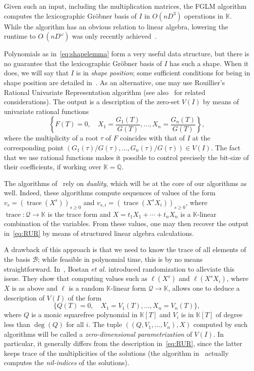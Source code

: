 \documentclass[12pt]{article}
\newcommand{\basis}{\mathscr{B}}
\newcommand{\trace}{\operatorname{trace}}
\newcommand{\lf}{X}
\newcommand{\residueI}{\mathscr{Q}}
\newcommand{\sqfree}{Q}
\def\Q {\ensuremath{\mathbb{Q}}}
\def\K{\mathbb{K}}
\def\K {\ensuremath{\mathbb{K}}}
\begin{document}
Given such an input, including the multiplication matrices, the FGLM
algorithm~\cite{FaGiLaMo93} computes the lexicographic Gr\"obner basis
of $I$ in $O(nD^3)$ operations in $\K$.  While the algorithm has an
obvious relation to linear algebra, lowering the runtime to
$O\tilde{~}(nD^\omega)$ was only recently
achieved~\cite{FaGaHuRe13,FaGaHuRe14,Neiger16}.

Polynomials as in~\cref{eq:shapelemma} form a very useful data
structure, but there is no guarantee that the lexicographic Gr\"obner
basis of $I$ has such a shape. When it does, we will say that $I$ is
in {\em shape position}; some sufficient conditions for being in shape
position are detailed in~\cite{BeMoMaTr94}.  As an alternative, one
may use Rouillier's Rational Univariate Representation algorithm
\cite{Rouillier99} (see also~\cite{AlBeRoWo94,BeWo96} for related
considerations). The output is a description of the zero-set $V(I)$ by
means of univariate rational functions
\begin{equation}\label{eq:RUR}
 \left\{  F(T)=0, \quad X_1 = \frac{G_1(T)}{G(T)}, \dots,X_n = \frac{G_n(T)}{G(T)} \right\},
\end{equation}
where the multiplicity of a root $\tau$ of $F$ coincides with that of
$I$ at the corresponding point
$(G_1(\tau)/G(\tau),\dots,G_n(\tau)/G(\tau)) \in V(I)$. The fact that
we use rational functions makes it possible to control
precisely the bit-size of their coefficients, if working over $\K=\Q$.

The algorithms of~\cite{AlBeRoWo94, BeWo96, Rouillier99} rely on
\emph{duality}, which will be at the core of our algorithms as well.
Indeed, these algorithms compute sequences of values of the form
$v_s=(\trace(\lf^s))_{s \ge 0}$ and 
$v_{s,i}=(\trace(\lf^s X_i))_{s \ge 0}$, where $\trace: \residueI \to \K$ is the trace 
form and $\lf=t_1 X_1 + \cdots + t_n X_n$ is  a $\K$-linear combination of the variables.
From these values, one may then recover the output in~\cref{eq:RUR} by means
of structured linear algebra calculations.

A drawback of this approach is that we need to know the trace of all
elements of the basis $\basis$; while feasible in polynomial time,
this is by no means straightforward. In~\cite{BoSaSc03}, Bostan {\it
  et al.} introduced randomization to alleviate this issue. They show
that computing values such as $\ell(\lf^s)$ and $\ell(\lf^s X_i)$, where
$\lf$ is as above and 
$\ell$ is a random $\K$-linear form $\residueI \to \K$, allows one to deduce
a description of $V(I)$ of the form
\begin{equation}\label{eq:BoSaSc03}
 \{  \sqfree(T)=0, \quad X_1 = V_1(T), \dots,X_n = V_n(T) \},
\end{equation}
where $\sqfree$ is a monic squarefree polynomial in $\K[T]$ and $V_i$ is in
$\K[T]$ of degree less than $\deg(\sqfree)$ for all $i$. The tuple
 $((\sqfree,V_1,\dots,V_n),\lf)$ computed by  such algorithms
will be called a {\em zero-dimensional parametrization} of $V(I)$. In
particular, it generally differs from the description
in~\cref{eq:RUR}, since the latter keeps trace of the multiplicities
of the solutions (the algorithm in~\cite{BoSaSc03} actually computes
the {\em nil-indices} of the solutions).
\end{document}

